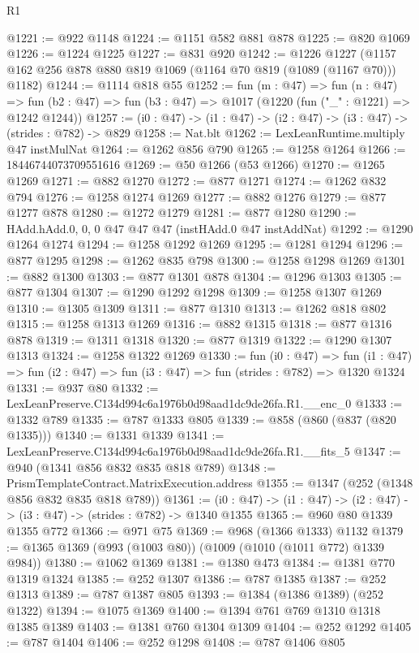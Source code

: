 \begin{lexlean}{R1}
\begin{coremodule}
@1221 := @922 @1148
@1224 := @1151 @582 @881 @878
@1225 := @820 @1069
@1226 := @1224 @1225
@1227 := @831 @920
@1242 := @1226
    @1227
    (@1157 @162 @256 @878 @880 @819 @1069 (@1164 @70 @819 (@1089 (@1167 @70))) @1182)
@1244 := @1114 @818 @55
@1252 := fun (m : @47) =>
  fun (n : @47) =>
  fun (b2 : @47) => fun (b3 : @47) => @1017 (@1220 (fun ("_" : @1221) => @1242 @1244))
@1257 := (i0 : @47) -> (i1 : @47) -> (i2 : @47) -> (i3 : @47) -> (strides : @782) -> @829
@1258 := Nat.blt
@1262 := LexLeanRuntime.multiply @47 instMulNat
@1264 := @1262 @856 @790
@1265 := @1258 @1264
@1266 := 18446744073709551616
@1269 := @50 @1266 (@53 @1266)
@1270 := @1265 @1269
@1271 := @882 @1270
@1272 := @877 @1271
@1274 := @1262 @832 @794
@1276 := @1258 @1274 @1269
@1277 := @882 @1276
@1279 := @877 @1277 @878
@1280 := @1272 @1279
@1281 := @877 @1280
@1290 := HAdd.hAdd.{0, 0, 0} @47 @47 @47 (instHAdd.{0} @47 instAddNat)
@1292 := @1290 @1264 @1274
@1294 := @1258 @1292 @1269
@1295 := @1281 @1294
@1296 := @877 @1295
@1298 := @1262 @835 @798
@1300 := @1258 @1298 @1269
@1301 := @882 @1300
@1303 := @877 @1301 @878
@1304 := @1296 @1303
@1305 := @877 @1304
@1307 := @1290 @1292 @1298
@1309 := @1258 @1307 @1269
@1310 := @1305 @1309
@1311 := @877 @1310
@1313 := @1262 @818 @802
@1315 := @1258 @1313 @1269
@1316 := @882 @1315
@1318 := @877 @1316 @878
@1319 := @1311 @1318
@1320 := @877 @1319
@1322 := @1290 @1307 @1313
@1324 := @1258 @1322 @1269
@1330 := fun (i0 : @47) =>
  fun (i1 : @47) => fun (i2 : @47) => fun (i3 : @47) => fun (strides : @782) => @1320 @1324
@1331 := @937 @80
@1332 := LexLeanPreserve.C134d994c6a1976b0d98aad1dc9de26fa.R1.__enc_0
@1333 := @1332 @789
@1335 := @787 @1333 @805
@1339 := @858 (@860 (@837 (@820 @1335)))
@1340 := @1331 @1339
@1341 := LexLeanPreserve.C134d994c6a1976b0d98aad1dc9de26fa.R1.__fits_5
@1347 := @940 (@1341 @856 @832 @835 @818 @789)
@1348 := PrismTemplateContract.MatrixExecution.address
@1355 := @1347 (@252 (@1348 @856 @832 @835 @818 @789))
@1361 := (i0 : @47) -> (i1 : @47) -> (i2 : @47) -> (i3 : @47) -> (strides : @782) -> @1340 @1355
@1365 := @960 @80 @1339 @1355 @772
@1366 := @971 @75
@1369 := @968 (@1366 @1333) @1132
@1379 := @1365 @1369 (@993 (@1003 @80)) (@1009 (@1010 (@1011 @772) @1339 @984))
@1380 := @1062 @1369
@1381 := @1380 @473
@1384 := @1381 @770 @1319 @1324
@1385 := @252 @1307
@1386 := @787 @1385
@1387 := @252 @1313
@1389 := @787 @1387 @805
@1393 := @1384 (@1386 @1389) (@252 @1322)
@1394 := @1075 @1369
@1400 := @1394 @761 @769 @1310 @1318 @1385 @1389
@1403 := @1381 @760 @1304 @1309
@1404 := @252 @1292
@1405 := @787 @1404
@1406 := @252 @1298
@1408 := @787 @1406 @805

\end{coremodule}
\end{lexlean}
